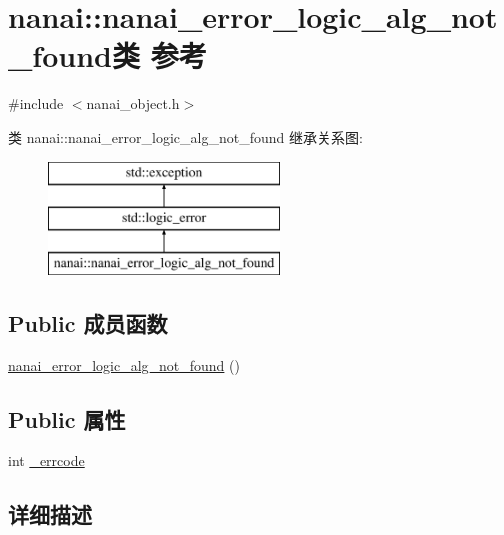 \hypertarget{classnanai_1_1nanai__error__logic__alg__not__found}{}\section{nanai\+:\+:nanai\+\_\+error\+\_\+logic\+\_\+alg\+\_\+not\+\_\+found类 参考}
\label{classnanai_1_1nanai__error__logic__alg__not__found}


{\ttfamily \#include $<$nanai\+\_\+object.\+h$>$}

类 nanai\+:\+:nanai\+\_\+error\+\_\+logic\+\_\+alg\+\_\+not\+\_\+found 继承关系图\+:\begin{figure}[H]
\begin{center}
\leavevmode
\includegraphics[height=3.000000cm]{classnanai_1_1nanai__error__logic__alg__not__found}
\end{center}
\end{figure}
\subsection*{Public 成员函数}
\begin{DoxyCompactItemize}
\item 
\hyperlink{classnanai_1_1nanai__error__logic__alg__not__found_a37482f1286e3edda3e41e8db08be3899}{nanai\+\_\+error\+\_\+logic\+\_\+alg\+\_\+not\+\_\+found} ()
\end{DoxyCompactItemize}
\subsection*{Public 属性}
\begin{DoxyCompactItemize}
\item 
int \hyperlink{classnanai_1_1nanai__error__logic__alg__not__found_a7701cdbe37605cdaebce0e8a6195e8d9}{\+\_\+errcode}
\end{DoxyCompactItemize}


\subsection{详细描述}


